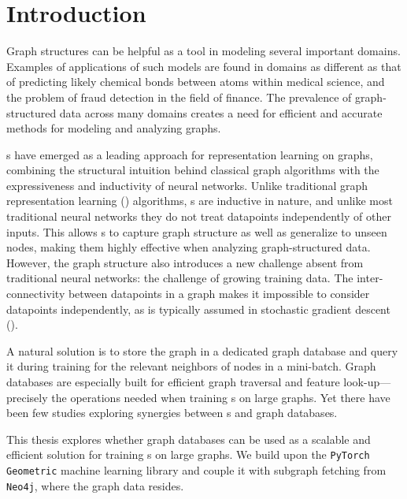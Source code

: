 

\chapter{Introduction}\label{ch:introduction}

Graph structures can be helpful as a tool in modeling several important domains.
Examples of applications of such models are found in domains as different as that of
predicting likely chemical bonds between atoms within medical science, and the problem
of fraud detection in the field of finance. The prevalence of graph-structured data
across many domains creates a need for efficient and accurate methods for modeling and
analyzing graphs.

s have emerged as a leading approach for representation learning on
graphs, combining the structural intuition behind classical graph algorithms with the
expressiveness and inductivity of neural networks. Unlike traditional graph
representation learning () algorithms, s are inductive in
nature, and unlike most traditional neural networks they do not treat datapoints
independently of other inputs. This allows s to capture graph structure
as well as generalize to unseen nodes, making them highly effective when analyzing
graph-structured data. However, the graph structure also introduces a new challenge
absent from traditional neural networks: the challenge of growing training data. The
inter-connectivity between datapoints in a graph makes it impossible to consider
datapoints independently, as is typically assumed in stochastic gradient descent
().

A natural solution is to store the graph in a dedicated graph database and query it
during training for the relevant neighbors of nodes in a mini-batch. Graph databases
are especially built for efficient graph traversal and feature look-up---precisely the
operations needed when training s on large graphs. Yet there have been
few studies exploring synergies between s and graph databases.

This thesis explores whether graph databases can be used as a scalable and efficient
solution for training s on large graphs. We build upon the
\texttt{PyTorch Geometric} machine learning library and couple it with subgraph
fetching from \texttt{Neo4j}, where the graph data resides.


